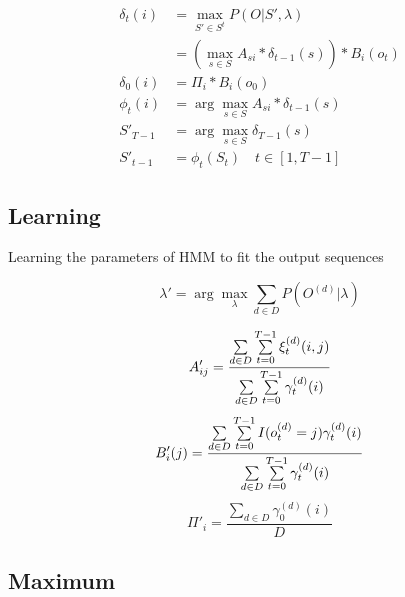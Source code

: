 \documentclass[a4paper,12pt]{article}
\begin{document}
                \begin{equation}
                    \begin{split}
                        \delta_t(i)&=\max_{S'\in S^t} P(O|S',\lambda)\\
                        &=\left(\max_{s\in S} A_{si}*\delta_{t-1}(s)\right)*B_i(o_t)\\
                        \delta_0(i)&=\Pi_i*B_i(o_0)\\
                        \phi_t(i)&=\arg\max_{s\in S} A_{si}*\delta_{t-1}(s)\\
                        S'_{T-1}&=\arg\max_{s\in S} \delta_{T-1}(s)\\
                        S'_{t-1}&=\phi_t(S_t) \quad t\in [1,T-1]
                    \end{split}
                \end{equation}

        \subsection{Learning}

            Learning the parameters of HMM to fit the output sequences

            \begin{equation}
                \lambda'=\arg\max_\lambda \sum_{d\in D} P(O^{(d)}|\lambda)
            \end{equation}

            \begin{equation}
                A'_{ij}=\frac{\sum\limits_{d\in D}\sum\limits_{t=0}^{T-1} \xi_t^{(d)}(i,j)}{\sum\limits_{d\in D}\sum\limits_{t=0}^{T-1} \gamma_t^{(d)}(i)}\\
            \end{equation}
            \begin{equation}
                B'_i(j)=\frac{\sum\limits_{d\in D}\sum\limits_{t=0}^{T-1} I(o_t^{(d)}=j) \gamma_t^{(d)}(i)}{\sum\limits_{d\in D}\sum\limits_{t=0}^{T-1} \gamma_t^{(d)}(i)}\\
            \end{equation}
            \begin{equation}
                \Pi'_i=\frac{\sum\limits_{d\in D} \gamma_0^{(d)}(i)}{D}
            \end{equation}

        \subsection{Maximum}
\end{document}
